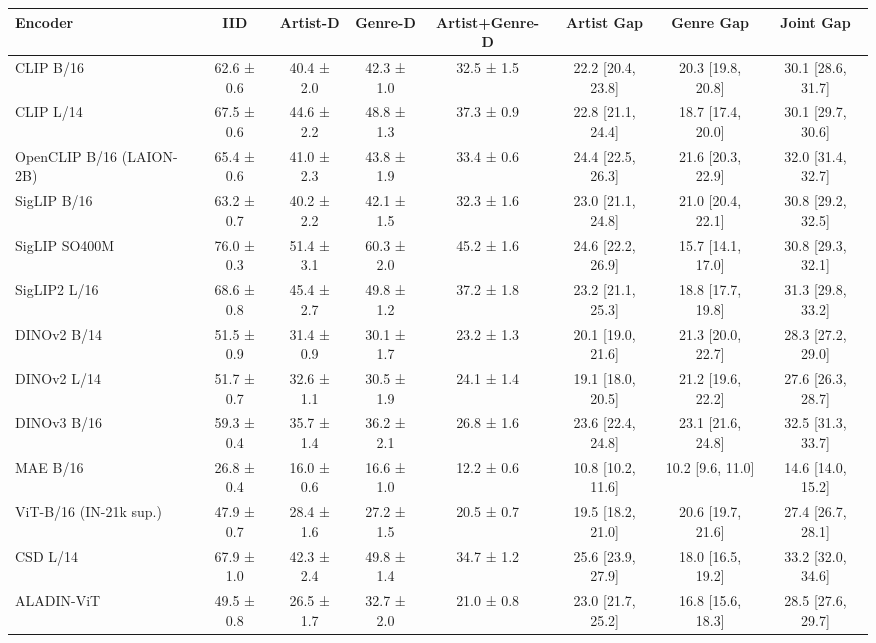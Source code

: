\begin{tabular}{lccccccc}
\toprule
Encoder & IID & Artist-D & Genre-D & Artist+Genre-D & Artist Gap & Genre Gap & Joint Gap \\
\midrule
CLIP B/16 & 62.6 ± 0.6 & 40.4 ± 2.0 & 42.3 ± 1.0 & 32.5 ± 1.5 & 22.2 [20.4, 23.8] & 20.3 [19.8, 20.8] & 30.1 [28.6, 31.7] \\
CLIP L/14 & 67.5 ± 0.6 & 44.6 ± 2.2 & 48.8 ± 1.3 & 37.3 ± 0.9 & 22.8 [21.1, 24.4] & 18.7 [17.4, 20.0] & 30.1 [29.7, 30.6] \\
OpenCLIP B/16 (LAION-2B) & 65.4 ± 0.6 & 41.0 ± 2.3 & 43.8 ± 1.9 & 33.4 ± 0.6 & 24.4 [22.5, 26.3] & 21.6 [20.3, 22.9] & 32.0 [31.4, 32.7] \\
SigLIP B/16 & 63.2 ± 0.7 & 40.2 ± 2.2 & 42.1 ± 1.5 & 32.3 ± 1.6 & 23.0 [21.1, 24.8] & 21.0 [20.4, 22.1] & 30.8 [29.2, 32.5] \\
SigLIP SO400M & 76.0 ± 0.3 & 51.4 ± 3.1 & 60.3 ± 2.0 & 45.2 ± 1.6 & 24.6 [22.2, 26.9] & 15.7 [14.1, 17.0] & 30.8 [29.3, 32.1] \\
SigLIP2 L/16 & 68.6 ± 0.8 & 45.4 ± 2.7 & 49.8 ± 1.2 & 37.2 ± 1.8 & 23.2 [21.1, 25.3] & 18.8 [17.7, 19.8] & 31.3 [29.8, 33.2] \\
DINOv2 B/14 & 51.5 ± 0.9 & 31.4 ± 0.9 & 30.1 ± 1.7 & 23.2 ± 1.3 & 20.1 [19.0, 21.6] & 21.3 [20.0, 22.7] & 28.3 [27.2, 29.0] \\
DINOv2 L/14 & 51.7 ± 0.7 & 32.6 ± 1.1 & 30.5 ± 1.9 & 24.1 ± 1.4 & 19.1 [18.0, 20.5] & 21.2 [19.6, 22.2] & 27.6 [26.3, 28.7] \\
DINOv3 B/16 & 59.3 ± 0.4 & 35.7 ± 1.4 & 36.2 ± 2.1 & 26.8 ± 1.6 & 23.6 [22.4, 24.8] & 23.1 [21.6, 24.8] & 32.5 [31.3, 33.7] \\
MAE B/16 & 26.8 ± 0.4 & 16.0 ± 0.6 & 16.6 ± 1.0 & 12.2 ± 0.6 & 10.8 [10.2, 11.6] & 10.2 [9.6, 11.0] & 14.6 [14.0, 15.2] \\
ViT-B/16 (IN-21k sup.) & 47.9 ± 0.7 & 28.4 ± 1.6 & 27.2 ± 1.5 & 20.5 ± 0.7 & 19.5 [18.2, 21.0] & 20.6 [19.7, 21.6] & 27.4 [26.7, 28.1] \\
CSD L/14 & 67.9 ± 1.0 & 42.3 ± 2.4 & 49.8 ± 1.4 & 34.7 ± 1.2 & 25.6 [23.9, 27.9] & 18.0 [16.5, 19.2] & 33.2 [32.0, 34.6] \\
ALADIN-ViT & 49.5 ± 0.8 & 26.5 ± 1.7 & 32.7 ± 2.0 & 21.0 ± 0.8 & 23.0 [21.7, 25.2] & 16.8 [15.6, 18.3] & 28.5 [27.6, 29.7] \\
\bottomrule
\end{tabular}
